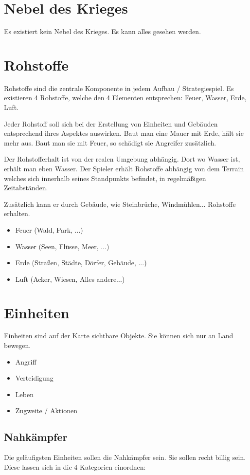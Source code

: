 \section{Nebel des Krieges}
Es existiert kein Nebel des Krieges. Es kann alles gesehen werden.

\section{Rohstoffe}

Rohstoffe sind die zentrale Komponente in jedem Aufbau / Strategiespiel. Es existieren 4 Rohstoffe, welche den 4 Elementen entsprechen: Feuer, Wasser, Erde, Luft.

Jeder Rohstoff soll sich bei der Erstellung von Einheiten und Gebäuden entsprechend ihres Aspektes auswirken. Baut man eine Mauer mit Erde, hält sie mehr aus. Baut man sie mit Feuer, so schädigt sie Angreifer zusätzlich.

Der Rohstofferhalt ist von der realen Umgebung abhängig. Dort wo Wasser ist, erhält man eben Wasser. Der Spieler erhält Rohstoffe abhängig von dem Terrain welches sich innerhalb seines Standpunkts befindet, in regelmäßigen Zeitabständen.

Zusätzlich kann er durch Gebäude, wie Steinbrüche, Windmühlen... Rohstoffe erhalten.

\begin{itemize}
\item Feuer (Wald, Park, ...)
\item Wasser (Seen, Flüsse, Meer, ...)
\item Erde (Straßen, Städte, Dörfer, Gebäude, ...)
\item Luft (Acker, Wiesen, Alles andere...)
\end{itemize}

\section{Einheiten}

Einheiten sind auf der Karte sichtbare Objekte. Sie können sich nur an Land bewegen. 
\begin{itemize}
\item Angriff 
\item Verteidigung
\item Leben
\item Zugweite / Aktionen
\end{itemize}


\subsection{Nahkämpfer}
Die geläufigsten Einheiten sollen die Nahkämpfer sein. Sie sollen recht billig sein.
Diese lassen sich in die 4 Kategorien einordnen:

